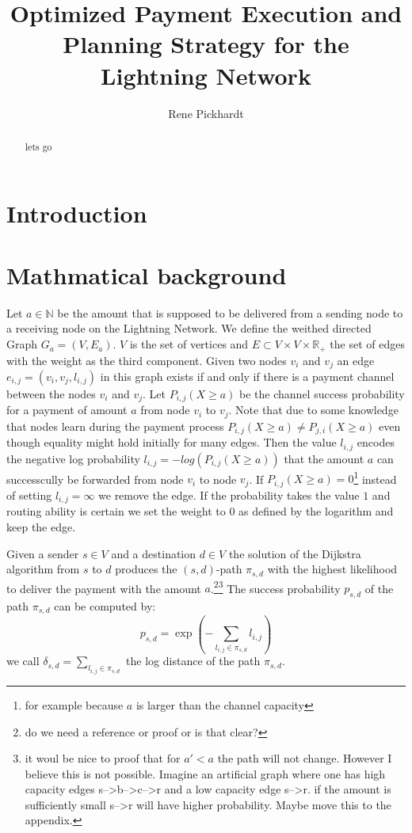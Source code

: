 \documentclass[10pt,twocolumn]{article}
\title{Optimized Payment Execution and Planning Strategy for the Lightning Network}
\begin{document}
 

\author{Rene Pickhardt}

\maketitle

 
\begin{abstract}
lets go
\end{abstract}

\section{Introduction}

\section{Mathmatical background}
Let $a\in\mathbb{N}$ be the amount that is supposed to be delivered from a sending node to a receiving node on the Lightning Network.
We define the weithed directed Graph $G_a = (V,E_a)$. 
$V$ is the set of vertices and $E\subset V\times V \times \mathbb{R}_+$ the set of edges with the weight as the third component.
Given two nodes $v_i$ and $v_j$ an edge $e_{i,j}=(v_i,v_j,l_{i,j})$ in this graph exists if and only if there is a payment channel between the nodes $v_i$ and $v_j$.
Let $P_{i,j}(X\geq a)$ be the channel success probability for a payment of amount $a$ from node $v_i$ to $v_j$.
Note that due to some knowledge that nodes learn during the payment process $P_{i,j}(X\geq a) \neq P_{j,i}(X\geq a)$ even though equality might hold initially for many edges.
Then the value $l_{i,j}$ encodes the negative log probability $l_{i,j} = - log(P_{i,j}(X\geq a))$ that the amount $a$ can successcully be forwarded from node $v_i$ to node $v_j$.
If $P_{i,j}(X\geq a) = 0$\footnote{for example because $a$ is larger than the channel capacity} instead of setting $l_{i,j}=\infty$ we remove the edge.
If the probability takes the value $1$ and routing ability is certain we set the weight to $0$ as defined by the logarithm and keep the edge.

Given a sender $s \in V$  and a destination $d\in V$ the solution of the Dijkstra algorithm from $s$ to $d$ produces the $(s,d)$-path $\pi_{s,d}$ with the highest likelihood to deliver the payment with the amount $a$.\footnote{do we need a reference or proof or is that clear?}\footnote{it woul be nice to proof that for $a'<a$ the path will not change. However I believe this is not possible. Imagine an artificial graph where one has high capacity edges s-->b-->c-->r and a low capacity edge s-->r. if the amount is sufficiently small s-->r will have higher probability. Maybe move this to the appendix.}
The success probability $p_{s,d}$ of the path $\pi_{s,d}$ can be computed by:
\[
p_{s,d} = \exp\left(-\sum_{l_{i,j}\in \pi_{s,d}}l_{i,j}\right)
\]
we call $\delta_{s,d} = \sum_{l_{i,j}\in \pi_{s,d}}$ the log distance of the path $\pi_{s,d}$.
\end{document}

